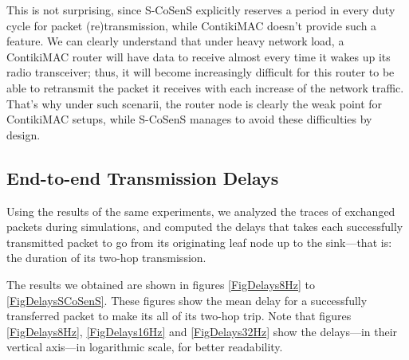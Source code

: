\documentclass[a4paper,twoside]{article}
\begin{document}
This is not surprising, since S-CoSenS explicitly reserves a period in every
duty cycle for packet (re)transmission, while ContikiMAC doesn't provide
such a feature. We can clearly understand that under heavy network load,
a ContikiMAC router will have data to receive almost every time it wakes up
its radio transceiver; thus, it will become increasingly difficult for this
router to be able to retransmit the packet it receives with each increase
of the network traffic. That's why under such scenarii, the router node
is clearly the weak point for ContikiMAC setups, while S-CoSenS manages
to avoid these difficulties by design.



\subsection{End-to-end Transmission Delays}

Using the results of the same experiments, we analyzed the traces of
exchanged packets during simulations, and computed the delays that takes each
successfully transmitted packet to go from its originating leaf node up to
the sink---that is: the duration of its two-hop transmission.

The results we obtained are shown in figures \ref{FigDelays8Hz} to
\ref{FigDelaysSCoSenS}. These figures show the mean delay for
a successfully transferred packet to make its all of its two-hop trip.
Note that figures \ref{FigDelays8Hz}, \ref{FigDelays16Hz} and
\ref{FigDelays32Hz} show the delays---in their vertical axis---in
logarithmic scale, for better readability.
\end{document}
